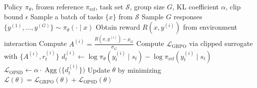 \begin{algorithm}[t]
  \caption{GRPO+OPSD}
  \label{alg:grpo_opsd}
  \begin{algorithmic}[1]
  \Require Policy $\pi_{\theta}$, frozen reference $\pi_{\mathrm{ref}}$, task set
  $\mathcal{S}$, group size $G$, KL coefficient $\alpha$, clip bound $\epsilon$
      \State Sample a batch of tasks $\{x\}$ from $\mathcal{S}$
          \State {}
          \State Sample $G$ responses $\{y^{(1)},\dots,y^{(G)}\} \sim \pi_{\theta}(\cdot \mid
  x)$
          \State {}
              \State Obtain reward $R(x, y^{(i)})$ from environment interaction
          \EndFor
          \State Compute $A^{(i)} = \frac{R(x,y^{(i)}) - \mu_G}{\sigma_G}$
          \State {}
          \State Compute $\mathcal{L}_{\mathrm{GRPO}}$ via clipped surrogate with $\{A^{(i)},
  r_t^{(i)}\}$
          \State {}
                  \State $d_t^{(i)} \gets \log\pi_{\theta}(y_t^{(i)} \mid s_t) -
  \log\pi_{\mathrm{ref}}(y_t^{(i)} \mid s_t)$
              \EndFor
          \EndFor
          \State $\mathcal{L}_{\mathrm{OPSD}} \gets
  \alpha \cdot \operatorname{Agg}\!\bigl(\{d_t^{(i)}\}\bigr)$
          \State {}
          \State Update $\theta$ by minimizing $\mathcal{L}(\theta) =
  \mathcal{L}_{\mathrm{GRPO}}(\theta) + \mathcal{L}_{\mathrm{OPSD}}(\theta)$
      \EndFor
  \EndFor
  \end{algorithmic}
\end{algorithm}

